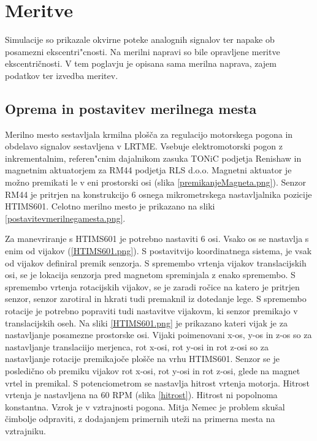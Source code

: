 \chapter{Meritve}

Simulacije so prikazale okvirne poteke analognih signalov ter napake  ob posamezni ekscentri"cnosti.
Na merilni napravi so bile opravljene meritve ekscentričnosti. V tem poglavju je opisana sama merilna naprava, zajem podatkov ter izvedba meritev.

\section{Oprema in postavitev merilnega mesta}

Merilno mesto sestavljala krmilna plošča za regulacijo motorskega pogona in obdelavo signalov sestavljena v LRTME.
Vsebuje elektromotorski pogon z inkrementalnim, referen"cnim dajalnikom zasuka TONiC podjetja Renishaw in magnetnim aktuatorjem za RM44 podjetja RLS  d.o.o.
Magnetni aktuator je možno premikati le v eni prostorski osi (slika \ref{premikanjeMagneta.png}).
Senzor RM44 je pritrjen na konstrukcijo 6 osnega mikrometrskega nastavljalnika pozicije HTIMS601.
Celotno merilno mesto je prikazano na sliki \ref{postavitevmerilnegamesta.png}.



Za manevriranje s HTIMS601 je potrebno nastaviti 6 osi.
Vsako os se nastavlja s enim od vijakov (\ref{HTIMS601.png}).
S postavitvijo koordinatnega sistema, je vsak od vijakov definiral premik senzorja. 
S spremembo vrtenja vijakov translacijskih osi, se je lokacija senzorja pred magnetom spreminjala z enako spremembo. S spremembo vrtenja rotacijskih vijakov, se je zaradi ročice na katero je pritrjen senzor, senzor zarotiral in hkrati tudi premaknil iz dotedanje lege. S spremembo rotacije je potrebno popraviti tudi nastavitve vijakovm, ki senzor premikajo v translacijskih oseh.
Na sliki \ref{HTIMS601.png} je prikazano kateri vijak je za nastavljanje posamezne prostorske osi. Vijaki poimenovani x-os, y-os in z-os so za nastavljanje translaciijo merjenca, rot x-osi, rot y-osi in rot z-osi so za nastavljanje rotacije premikajoče plošče na vrhu HTIMS601.
Senzor se je posledično ob premiku vijakov rot x-osi, rot y-osi in rot z-osi, glede na magnet vrtel in premikal.
S potenciometrom se nastavlja hitrost vrtenja motorja.
Hitrost vrtenja je nastavljena na 60 RPM (slika \ref{hitrost}). Hitrost ni popolnoma konstantna. Vzrok je v vztrajnosti pogona. Mitja Nemec je problem skušal čimbolje odpraviti, z dodajanjem primernih uteži na primerna mesta na vztrajniku.


